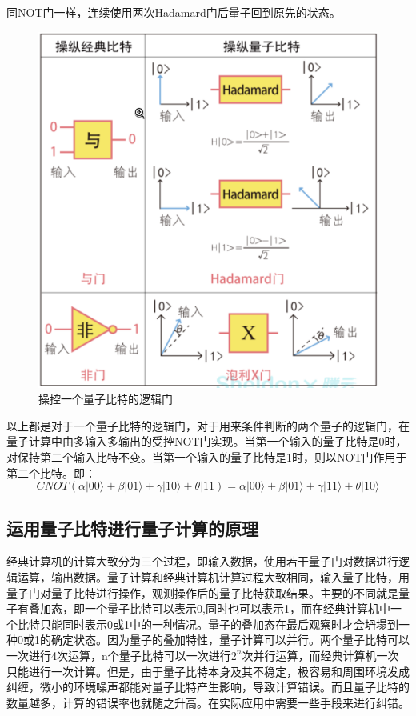 \documentclass{article}
\begin{document}
同NOT门一样，连续使用两次Hadamard门后量子回到原先的状态。
\begin{figure}[H]
  \centering
  \includegraphics[width=0.6\linewidth]{figures/操控一个量子比特的逻辑门}
  \caption{操控一个量子比特的逻辑门}
\end{figure}
以上都是对于一个量子比特的逻辑门，对于用来条件判断的两个量子的逻辑门，在量子计算中由多输入多输出的受控NOT门实现。当第一个输入的量子比特是0时，对保持第二个输入比特不变。当第一个输入的量子比特是1时，则以NOT门作用于第二个比特。即：
\begin{equation}
  \label{}
CNOT(\alpha | 00 \rangle + \beta | 01 \rangle + \gamma | 10 \rangle + \theta | 11) = \alpha | 00 \rangle + \beta | 01 \rangle + \gamma | 11 \rangle + \theta | 10 \rangle
\end{equation}




\subsection{运用量子比特进行量子计算的原理}
\label{subsec:label}
经典计算机的计算大致分为三个过程，即输入数据，使用若干量子门对数据进行逻辑运算，输出数据。量子计算和经典计算机计算过程大致相同，输入量子比特，用量子门对量子比特进行操作，观测操作后的量子比特获取结果。主要的不同就是量子有叠加态，即一个量子比特可以表示0,同时也可以表示1，而在经典计算机中一个比特只能同时表示0或1中的一种情况。量子的叠加态在最后观察时才会坍塌到一种0或1的确定状态。因为量子的叠加特性，量子计算可以并行。两个量子比特可以一次进行4次运算，n个量子比特可以一次进行$2^{n}$次并行运算，而经典计算机一次只能进行一次计算。但是，由于量子比特本身及其不稳定，极容易和周围环境发成纠缠，微小的环境噪声都能对量子比特产生影响，导致计算错误。而且量子比特的数量越多，计算的错误率也就随之升高。在实际应用中需要一些手段来进行纠错。
\end{document}
